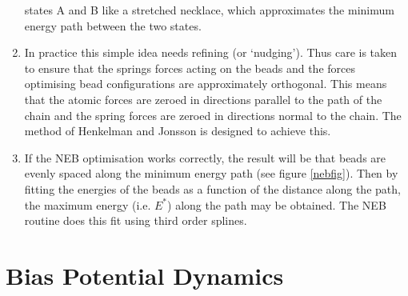 \begin{enumerate}
states A and B like a stretched necklace, which approximates the
minimum energy path between the two states.
\item In practice this simple idea needs refining (or
`nudging'). Thus care is taken to ensure that the springs forces
acting on the beads and the forces optimising bead configurations are
approximately orthogonal. This means that the atomic forces are zeroed
in directions parallel to the path of the chain and the spring forces
are zeroed in directions normal to the chain. The method of Henkelman
and Jonsson \cite{henkelman-00a} is designed to achieve this.
\item If the NEB optimisation works correctly, the result will be that
beads are evenly spaced along the minimum energy path (see figure
\ref{nebfig}). Then by fitting the energies of the beads as a function
of the distance along the path, the maximum energy (i.e. $E^{*}$)
along the path may be obtained. The \D{} NEB routine does this fit using
third order splines.
\end{enumerate}

\section{Bias Potential Dynamics}
\label{BPD}
